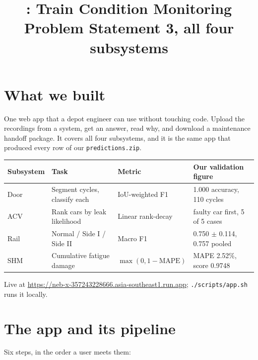 \documentclass[11pt,a4paper]{article}
\title{\vspace{-1.4cm}\app: Train Condition Monitoring\\[0.2em]
\large Problem Statement 3, all four subsystems}
\author{}
\date{}
\begin{document}
\maketitle
\vspace{-1.6cm}

\section{What we built}

One web app that a depot engineer can use without touching code. Upload the recordings from a
system, get an answer, read why, and download a maintenance handoff package. It covers all four
subsystems, and it is the same app that produced every row of our \texttt{predictions.zip}.

\begin{center}\small
\begin{tabular}{@{}llll@{}}
\toprule
\textbf{Subsystem} & \textbf{Task} & \textbf{Metric} & \textbf{Our validation figure} \\
\midrule
Door  & Segment cycles, classify each   & IoU-weighted F1 & 1.000 accuracy, 110 cycles \\
ACV   & Rank cars by leak likelihood    & Linear rank-decay & faulty car first, 5 of 5 cases \\
Rail  & Normal / Side I / Side II       & Macro F1 & 0.750 $\pm$ 0.114, 0.757 pooled \\
SHM   & Cumulative fatigue damage       & $\max(0, 1-\mathrm{MAPE})$ & MAPE 2.52\%, score 0.9748 \\
\bottomrule
\end{tabular}
\end{center}

Live at \url{https://neb-x-357243228666.asia-southeast1.run.app}; \texttt{./scripts/app.sh} runs
it locally.

\section{The app and its pipeline}

Six steps, in the order a user meets them:
\end{document}
